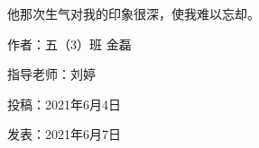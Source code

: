 他那次生气对我的印象很深，使我难以忘却。





\vspace{10pt}



作者：五（3）班 金磊



指导老师：刘婷



投稿：2021年6月4日



发表：2021年6月7日










                



\vspace{10pt}

\hline



